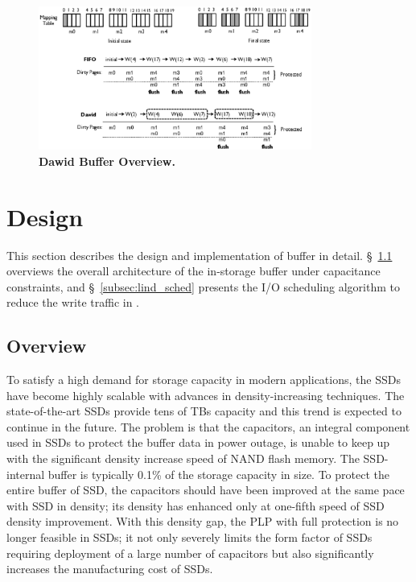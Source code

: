 \begin{figure}
    \centering{}
    \includegraphics[width=0.8\textwidth]{figure/dawid_algo.eps}
    \caption{\textbf{Dawid Buffer Overview.}}
    \label{fig:dawid_buff_overview}
\end{figure}

\section{Design}
This section describes the design and implementation of \ours{} buffer in detail. 
\S~\ref{subsec:overview} overviews the overall architecture of the in-storage buffer under capacitance constraints, and \S~\ref{subsec:lind_sched} presents the I/O scheduling algorithm
to reduce the write traffic in \ours{}.

\subsection{Overview}
\label{subsec:overview}
To satisfy a high demand for storage capacity in modern applications,
the SSDs have become highly scalable with advances in density-increasing techniques. 
The state-of-the-art SSDs provide tens of TBs capacity and this trend is expected 
to continue in the future.
The problem is that the capacitors, an integral component used in SSDs to protect the buffer data
in power outage, is unable to keep up with the significant density increase speed of NAND flash memory. 
The SSD-internal buffer is typically 0.1\% of the storage capacity in size.
To protect the entire buffer of SSD, the capacitors 
should have been improved at the same pace with SSD in density; 
its density has enhanced only at one-fifth speed of SSD density improvement. 
With this density gap, the PLP with full protection is no longer feasible in SSDs; 
it not only severely limits the form factor of SSDs requiring deployment of a large number of capacitors but also significantly increases the manufacturing cost of SSDs. 

